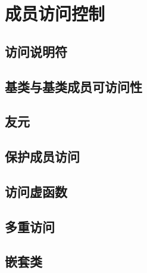 
\chapter{成员访问控制}

\section{访问说明符}
\section{基类与基类成员可访问性}
\section{友元}
\section{保护成员访问}
\section{访问虚函数}
\section{多重访问}
\section{嵌套类}
